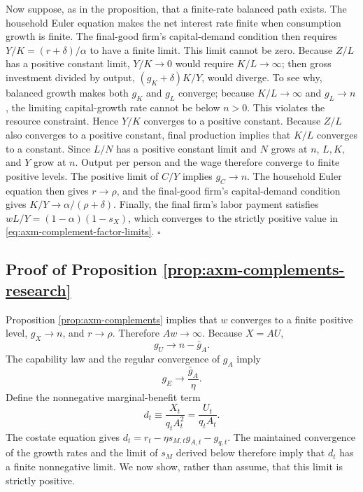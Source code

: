 Now suppose, as in the proposition, that a finite-rate balanced path exists.
The household Euler equation makes the net interest rate finite when consumption
growth is finite. The final-good firm's capital-demand condition then requires
\(Y/K=(r+\delta)/\alpha\) to have a finite limit. This limit cannot be zero.
Because \(Z/L\) has a positive constant limit,
\(Y/K\to0\) would require \(K/L\to\infty\); then gross investment divided by
output, \((g_K+\delta)K/Y\), would diverge. To see why, balanced growth makes
both \(g_K\) and \(g_L\) converge; because \(K/L\to\infty\) and \(g_L\to n\),
the limiting capital-growth rate cannot be below \(n>0\). This violates the
resource constraint. Hence
\(Y/K\) converges to a positive constant.
Because \(Z/L\) also converges to a positive constant, final production implies
that \(K/L\) converges to a constant. Since \(L/N\) has a positive constant limit
and \(N\) grows at \(n\), \(L,K,\) and \(Y\) grow at \(n\). Output per person and
the wage therefore converge to finite positive levels. The positive limit of
\(C/Y\) implies \(g_C\to n\). The household Euler equation then gives
\(r\to\rho\), and the final-good firm's capital-demand condition gives
\(K/Y\to\alpha/(\rho+\delta)\).
Finally, the final firm's labor payment satisfies
\(wL/Y=(1-\alpha)(1-s_X)\), which converges to the strictly positive value in
\eqref{eq:axm-complement-factor-limits}. \(\square\)

\subsection{Proof of Proposition \ref{prop:axm-complements-research}}

Proposition \ref{prop:axm-complements} implies that \(w\) converges to a finite
positive level, \(g_X\to n\), and \(r\to\rho\). Therefore \(Aw\to\infty\).
Because \(X=AU\),
\begin{equation}
 g_U\to n-\bar g_A.
 \label{eq:axm-proof-complement-gu}
\end{equation}
The capability law and the regular convergence of \(g_A\) imply
\begin{equation}
 g_E\to\frac{\bar g_A}{\eta}.
 \label{eq:axm-proof-complement-ge}
\end{equation}
Define the nonnegative marginal-benefit term
\begin{equation}
 d_t\equiv\frac{X_t}{q_tA_t^2}=\frac{U_t}{q_tA_t}.
 \label{eq:axm-proof-complement-d}
\end{equation}
The costate equation gives
\(d_t=r_t-\eta s_{M,t}g_{A,t}-g_{q,t}\). The maintained convergence of the
growth rates and the limit of \(s_M\) derived below therefore imply that \(d_t\)
has a finite nonnegative limit. We now show, rather than assume, that this limit
is strictly positive.

